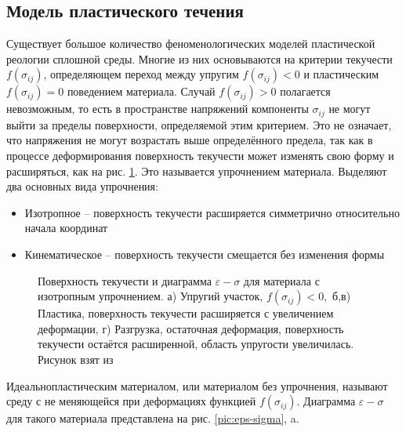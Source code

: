 \subsection{Модель пластического течения}
Существует большое количество феноменологических моделей пластической реологии сплошной среды.
Многие из них \cite{resler,kukudganov} основываются на критерии текучести $f(\sigma_{ij})$, определяющем переход между упругим $f(\sigma_{ij})<0$ и пластическим $f(\sigma_{ij})=0$ поведением материала. Случай $f(\sigma_{ij})>0$ полагается невозможным, то есть в пространстве напряжений компоненты $\sigma_{ij}$ не могут выйти за пределы поверхности, определяемой этим критерием. Это не означает, что напряжения не могут возрастать выше определённого предела, так как в процессе деформирования поверхность текучести может изменять свою форму и расширяться, как на рис. \ref{pic:uprochnenie}. Это называется упрочнением материала. Выделяют два основных вида упрочнения:
\begin{itemize}
\item Изотропное -- поверхность текучести расширяется симметрично относительно начала координат
\item Кинематическое -- поверхность текучести смещается без изменения формы
\end{itemize}
\begin{figure}[H]
\caption{Поверхность текучести и диаграмма $\varepsilon - \sigma$ для материала с изотропным упрочнением. а) Упругий участок, $f(\sigma_{ij})<0,$  б,в) Пластика, поверхность текучести расширяется с увеличением деформации, г) Разгрузка, остаточная деформация, поверхность текучести остаётся расширенной, область упругости увеличилась. Рисунок взят из \cite{resler}}
\label{pic:uprochnenie}
\end{figure}
Идеальнопластическим материалом, или материалом без упрочнения, называют среду с не меняющейся при деформациях функцией $f(\sigma_{ij})$. Диаграмма $\varepsilon - \sigma$ для такого материала представлена на рис. \ref{pic:eps-sigma}, a.

